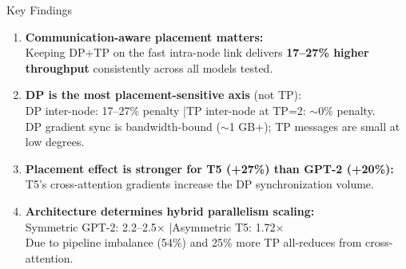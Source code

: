 \documentclass[10pt, aspectratio=169]{beamer}
\begin{document}
\begin{frame}{Key Findings}
  \begin{enumerate}
    \item \textbf{Communication-aware placement matters:}\\
    Keeping DP+TP on the fast intra-node link delivers \textbf{17--27\% higher throughput} consistently across all models tested.

    \vspace{0.3em}
    \item \textbf{DP is the most placement-sensitive axis} (not TP):\\
    DP inter-node: 17--27\% penalty \quad|\quad TP inter-node at TP=2: $\sim$0\% penalty.\\
    DP gradient sync is bandwidth-bound ($\sim$1 GB+); TP messages are small at low degrees.

    \vspace{0.3em}
    \item \textbf{Placement effect is stronger for T5 (+27\%) than GPT-2 (+20\%):}\\
    T5's cross-attention gradients increase the DP synchronization volume.

    \vspace{0.3em}
    \item \textbf{Architecture determines hybrid parallelism scaling:}\\
    Symmetric GPT-2: 2.2--2.5$\times$ \quad|\quad Asymmetric T5: 1.72$\times$\\
    Due to pipeline imbalance (54\%) and 25\% more TP all-reduces from cross-attention.
  \end{enumerate}
\end{frame}
\end{document}
